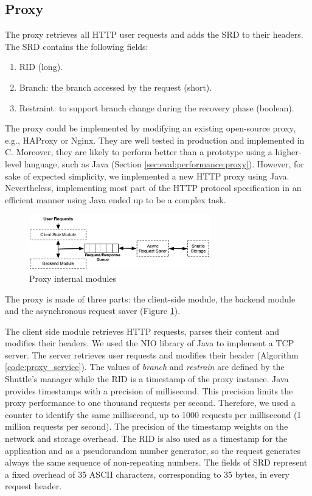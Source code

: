 \subsection{Proxy}\label{sec:impl:normal:proxy}
The proxy retrieves all \ac{HTTP} user requests and adds the \ac{SRD} to their headers. The \ac{SRD} contains the following fields:
\begin{enumerate}
	\item \ac{RID} (long).
	\item Branch: the branch accessed by the request (short).
	\item Restraint: to support branch change during the recovery phase (boolean).
\end{enumerate}

The proxy could be implemented by modifying an existing open-source proxy, e.g., HAProxy or Nginx. They are well tested in production and implemented in C. Moreover, they are likely to perform better than a prototype using a higher-level language, such as Java (Section \ref{sec:eval:performance:proxy}). However, for sake of expected simplicity, we implemented a new \ac{HTTP} proxy using Java. Nevertheless, implementing most part of the \ac{HTTP} protocol specification in an efficient manner using Java ended up to be a complex task.


\begin{figure}
  \centering
  \includegraphics[width=0.7\textwidth]{arch/proxy}
  \caption{Proxy internal modules}
  \label{fig:impl:proxy_modules}
\end{figure}

The proxy is made of three parts: the client-side module, the backend module and the asynchronous request saver (Figure \ref{fig:impl:proxy_modules}).

The client side module retrieves \ac{HTTP} requests, parses their content and modifies their headers. We used the \ac{NIO} library of Java to implement a TCP server. The server retrieves user requests and modifies their header (Algorithm \ref{code:proxy_service}). The values of \emph{branch} and \emph{restrain} are defined by the Shuttle's manager while the \ac{RID} is a timestamp of the proxy instance. Java provides timestamps with a precision of millisecond. This precision limits the proxy performance to one thousand requests per second. Therefore, we used a counter to identify the same millisecond, up to 1000 requests per millisecond (1 million requests per second). The precision of the timestamp weights on the network and storage overhead. The \ac{RID} is also used as a timestamp for the application and as a pseudorandom number generator, so the request generates always the same sequence of non-repeating numbers. The fields of \ac{SRD} represent a fixed overhead of 35 ASCII characters, corresponding to 35 bytes, in every request header.

